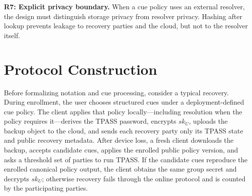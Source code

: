 \documentclass[sigconf,anonymous]{acmart}
\newcounter{protocol}
\newcommand{\LOCUS}{\textsf{LOCUS}}
\begin{document}
\textbf{R7: Explicit privacy boundary.}
When a cue policy uses an external resolver, the design must distinguish storage privacy from resolver privacy. Hashing after lookup prevents leakage to recovery parties and the cloud, but not to the resolver itself.

\section{Protocol Construction}
\label{sec:construction}

Before formalizing notation and cue processing, consider a typical recovery. During enrollment, the user chooses structured cues under a deployment-defined cue policy. The client applies that policy locally---including resolution when the policy requires it---derives the TPASS password, encrypts \(sk_U\), uploads the backup object to the cloud, and sends each recovery party only its TPASS state and public recovery metadata. After device loss, a fresh client downloads the backup, accepts candidate cues, applies the enrolled public policy version, and asks a threshold set of parties to run TPASS. If the candidate cues reproduce the enrolled canonical policy output, the client obtains the same group secret and decrypts \(sk_U\); otherwise recovery fails through the online protocol and is counted by the participating parties.


\end{document}
